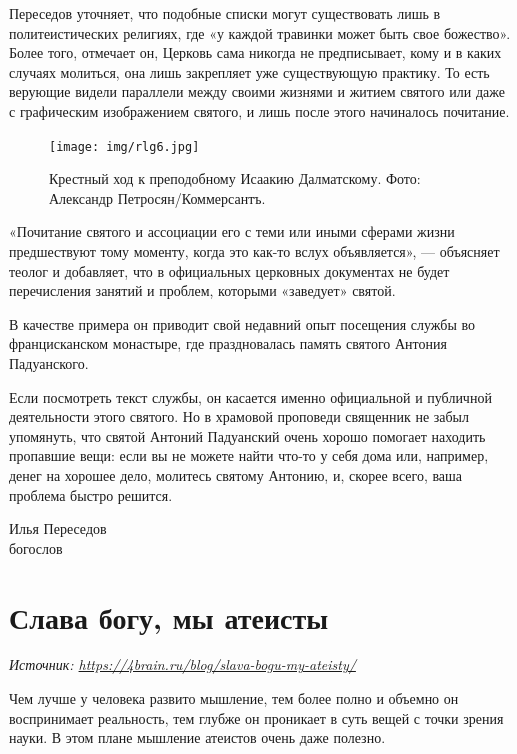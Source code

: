 Переседов уточняет, что подобные списки могут существовать лишь в политеистических религиях, где «у каждой травинки может быть свое божество». Более того, отмечает он, Церковь сама никогда не предписывает, кому и в каких случаях молиться, она лишь закрепляет уже существующую практику. То есть верующие видели параллели между своими жизнями и житием святого или даже с графическим изображением святого, и лишь после этого начиналось почитание.

\begin{figure}
    \centering
    \texttt{[image: img/rlg6.jpg]}
    \caption{Крестный ход к преподобному Исаакию Далматскому. Фото: Александр Петросян/Коммерсантъ.}
\end{figure}

«Почитание святого и ассоциации его с теми или иными сферами жизни предшествуют тому моменту, когда это как-то вслух объявляется», — объясняет теолог и добавляет, что в официальных церковных документах не будет перечисления занятий и проблем, которыми «заведует» святой.

В качестве примера он приводит свой недавний опыт посещения службы во францисканском монастыре, где праздновалась память святого Антония Падуанского.


\begin{fancyquotes}
    Если посмотреть текст службы, он касается именно официальной и публичной деятельности этого святого. Но в храмовой проповеди священник не забыл упомянуть, что святой Антоний Падуанский очень хорошо помогает находить пропавшие вещи: если вы не можете найти что-то у себя дома или, например, денег на хорошее дело, молитесь святому Антонию, и, скорее всего, ваша проблема быстро решится.\\

    \begin{flushright}
        Илья Переседов\\
        богослов
    \end{flushright}
\end{fancyquotes}



\clearpage

\section{Слава богу, мы атеисты}

\textit{Источник: \url{https://4brain.ru/blog/slava-bogu-my-ateisty/}}

Чем лучше у человека развито мышление, тем более полно и объемно он воспринимает реальность, тем глубже он проникает в суть вещей с точки зрения науки. В этом плане мышление атеистов очень даже полезно.

